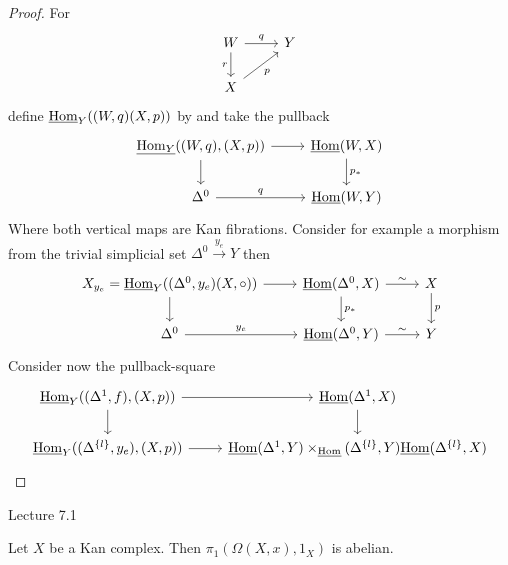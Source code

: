 \begin{proof}
    For 
    \[
    \begin{tikzcd}
        W
        \ar[r,"q"]
        \ar[d, "r"']
        &
        Y
        \\
        X
        \ar[ru, "p"']
    \end{tikzcd}
    \]
    define $\underline{\operatorname{Hom}}_Y((W,q)(X,p))$ by and take the pullback
    \[
    \begin{tikzcd}
        \underline{\Hom_Y}((W,q),(X,p)) 
        \ar[d]
        \rar
        &
        \underline{\Hom}(W,X)
        \ar[d, "p_*"]
        \\
        \Delta^0
        \ar[r, "q"]
        &
        \underline{\Hom}(W,Y)
    \end{tikzcd}
    \]
    Where both vertical maps are Kan fibrations.
    Consider for example a morphism from the trivial simplicial set $\Delta^0 \xrightarrow{y_e}Y$ then
    \[
    \begin{tikzcd}
        X_{y_e}=\underline{\Hom}_Y((\Delta^0,y_e)(X,\circ)) 
        \rar
        \dar
        &
        \underline{\Hom}(\Delta^0,X)
        \ar[r,"\sim"]
        \ar[d, "p_*"]
        &
        X
        \ar[d,"p"]
        \\
        \Delta^0
        \ar[r,"y_e"]
        &
        \underline{\Hom}(\Delta^0,Y)
        \ar[r, "\sim"]
        &
        Y
    \end{tikzcd}
    \]
    Consider now the pullback-square 
    \[
        \begin{tikzcd}
            \underline{\Hom}_Y((\Delta^1,f),(X,p))
            \rar
            \dar
            &
            \underline{\Hom}(\Delta^1,X)
            \dar
            \\
            \underline{\Hom}_Y((\Delta^{\{l\}},y_e),(X,p))
            \ar[r]
            &
            \underline{\Hom}(\Delta^1,Y) \times_{\underline{\Hom}}(\Delta^{\{l\}},Y) \underline{\Hom}(\Delta^{\{l\}},X)
        \end{tikzcd}
    \]
\end{proof}

Lecture 7.1

\begin{prop}
    Let $X$ be a Kan complex. 
    Then $\pi_1(\Omega(X,x),1_X)$ is abelian.
\end{prop}

